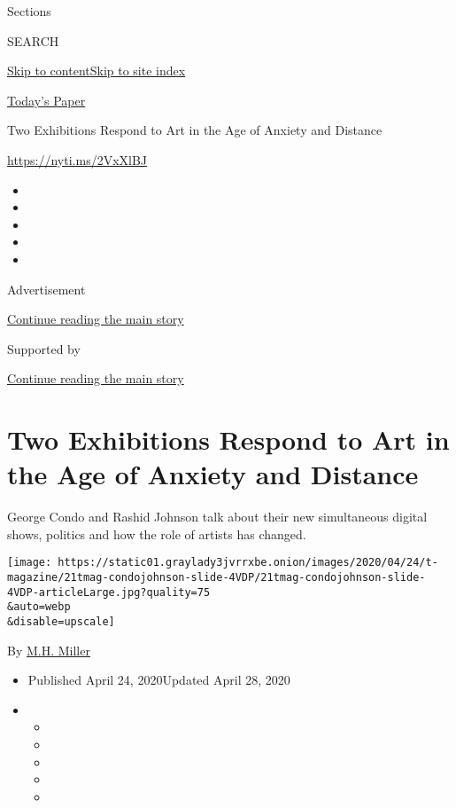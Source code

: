 Sections

SEARCH

\protect\hyperlink{site-content}{Skip to
content}\protect\hyperlink{site-index}{Skip to site index}

\href{https://myaccount.nytimes3xbfgragh.onion/auth/login?response_type=cookie\&client_id=vi}{}

\href{https://www.nytimes3xbfgragh.onion/section/todayspaper}{Today's
Paper}

Two Exhibitions Respond to Art in the Age of Anxiety and Distance

\url{https://nyti.ms/2VxXlBJ}

\begin{itemize}
\item
\item
\item
\item
\item
\end{itemize}

Advertisement

\protect\hyperlink{after-top}{Continue reading the main story}

Supported by

\protect\hyperlink{after-sponsor}{Continue reading the main story}

\hypertarget{two-exhibitions-respond-to-art-in-the-age-of-anxiety-and-distance}{%
\section{Two Exhibitions Respond to Art in the Age of Anxiety and
Distance}\label{two-exhibitions-respond-to-art-in-the-age-of-anxiety-and-distance}}

George Condo and Rashid Johnson talk about their new simultaneous
digital shows, politics and how the role of artists has changed.

\texttt{[image: https://static01.graylady3jvrrxbe.onion/images/2020/04/24/t-magazine/21tmag-condojohnson-slide-4VDP/21tmag-condojohnson-slide-4VDP-articleLarge.jpg?quality=75\\\&auto=webp\\\&disable=upscale]}

By \href{https://www.nytimes3xbfgragh.onion/by/m-h-miller}{M.H. Miller}

\begin{itemize}
\item
  Published April 24, 2020Updated April 28, 2020
\item
  \begin{itemize}
  \item
  \item
  \item
  \item
  \item
  \end{itemize}
\end{itemize}

